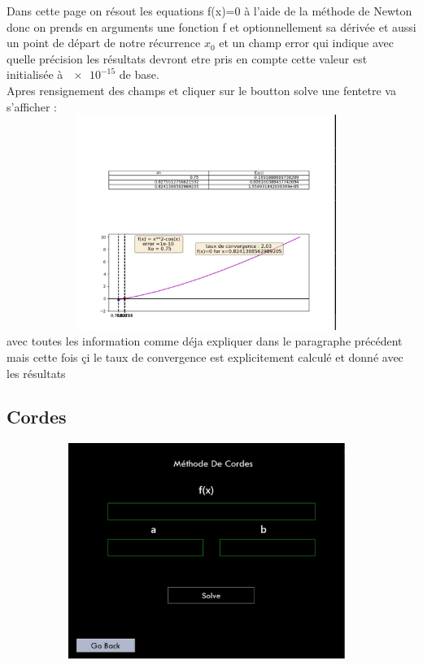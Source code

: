 \documentclass{article}
\begin{document}
Dans cette page on résout les equations f(x)=0 à l'aide de la méthode de Newton donc on prends en arguments une fonction f et optionnellement sa dérivée et aussi un point de départ de notre récurrence  $ x_0 $
et un champ error qui indique avec quelle précision les résultats devront etre pris en compte cette valeur est initialisée à $\num{e-15}$ de base.\\
Apres rensignement des champs et cliquer sur le boutton solve une fentetre va s'afficher :\\
\includegraphics[width=13cm,height=7cm]{img/newton_graph.JPG}\\
avec toutes les information comme déja expliquer dans le paragraphe précédent mais cette fois çi le taux de convergence est explicitement calculé et donné avec les résultats

\subsection{Cordes}
\includegraphics[width=13cm,height=7cm]{img/cordes.JPG}\\
\end{document}
